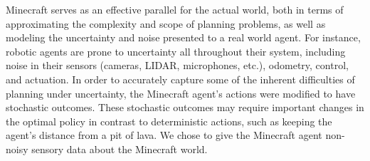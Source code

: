 \documentclass[]{article}
\newcommand{\stnote}[1]{\textcolor{Blue}{\textbf{ST: #1}}}
\begin{document}
Minecraft serves as an effective parallel for the actual world, both
in terms of approximating the complexity and scope of planning
problems, as well as modeling the uncertainty and noise presented to a
real world agent.  For instance, robotic agents are prone to
uncertainty all throughout their system, including noise in their
sensors (cameras, LIDAR, microphones, etc.), odometry, control, and
actuation.  In order to accurately capture some of the inherent
difficulties of planning under uncertainty, the Minecraft agent's
actions were modified to have stochastic outcomes. These stochastic
outcomes may require important changes in the optimal policy in
contrast to deterministic actions, such as keeping the agent's
distance from a pit of lava. We chose to give the Minecraft agent non-noisy sensory data about the Minecraft world.



%
\end{document}

